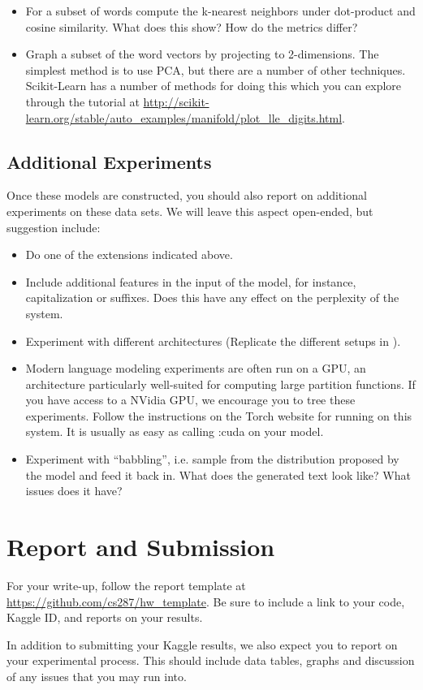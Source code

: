 \documentclass[11pt]{article}
\begin{document}
\begin{itemize}
\item For a subset of words compute the k-nearest neighbors under dot-product and
  cosine similarity. What does this show? How do the metrics differ?
\item Graph a subset of the word vectors by projecting to 2-dimensions.  The simplest method is to use PCA, but there are a number of other techniques. Scikit-Learn has a number of 
  methods for doing this which you can explore through the tutorial at \url{http://scikit-learn.org/stable/auto_examples/manifold/plot_lle_digits.html}.
\end{itemize}

\subsection{Additional Experiments}

Once these models are constructed, you should also report on
additional experiments on these data sets. We will leave this aspect
open-ended, but suggestion include:

\begin{itemize}
\item Do one of the extensions indicated above.
\item Include additional features in the input of the model, for instance, capitalization or suffixes. Does this have any effect on the perplexity of the system. 
\item Experiment with different architectures (Replicate the different setups in \cite{DBLP:journals/jmlr/BengioDVJ03}).
\item Modern language modeling experiments are often run on a GPU, an
  architecture particularly well-suited for computing large partition
  functions. If you have access to a NVidia GPU, we encourage you to
  tree these experiments. Follow the instructions on the Torch website for running on this 
  system. It is usually as easy as calling :cuda on your model.
\item Experiment with ``babbling'', i.e. sample from the distribution proposed by the model and 
feed it back in. What does the generated text look like? What issues does it have? 
\end{itemize}

\section{Report and Submission}

For your write-up, follow the report template at
\url{https://github.com/cs287/hw_template}. Be sure to include a link
to your code, Kaggle ID, and reports on your results.

In addition to submitting your Kaggle results, we also expect you to report on your 
experimental process. This should include data tables, graphs and discussion of any 
issues that you may run into. 

 

\end{document}
